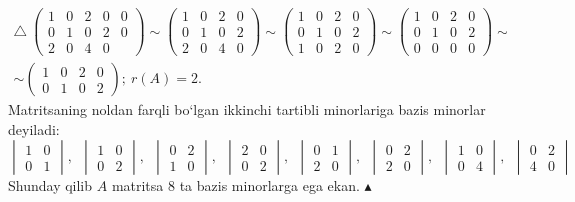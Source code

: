 \begin{enumerate}
\begin{multline*}\triangle\ \begin{pmatrix}
	1&0&2&0&0\\0&1&0&2&0\\2&0&4&0&
\end{pmatrix}\sim\begin{pmatrix}
1&0&2&0\\0&1&0&2\\2&0&4&0
\end{pmatrix}\sim\begin{pmatrix}
1&0&2&0\\0&1&0&2\\1&0&2&0
\end{pmatrix}\sim\begin{pmatrix}
1&0&2&0\\0&1&0&2\\0&0&0&0
\end{pmatrix}\sim\\
\sim\begin{pmatrix}
1&0&2&0\\0&1&0&2
\end{pmatrix};\ r(A)=2.
\end{multline*} 
Matritsaning noldan farqli bo`lgan ikkinchi tartibli minorlariga bazis minorlar deyiladi:
$$\begin{vmatrix}
	1&0\\0&1
\end{vmatrix},\ \ \begin{vmatrix}
1&0\\0&2
\end{vmatrix},\ \ \begin{vmatrix}
0&2\\1&0
\end{vmatrix},\ \ \begin{vmatrix}
2&0\\0&2
\end{vmatrix},\ \ \begin{vmatrix}
0&1\\2&0
\end{vmatrix},\ \ \begin{vmatrix}
0&2\\2&0
\end{vmatrix},\ \ \begin{vmatrix}
1&0\\0&4
\end{vmatrix},\ \ \begin{vmatrix}
0&2\\4&0
\end{vmatrix}
$$
Shunday qilib $A$ matritsa 8 ta bazis minorlarga ega ekan. $\blacktriangle$


\end{enumerate}
